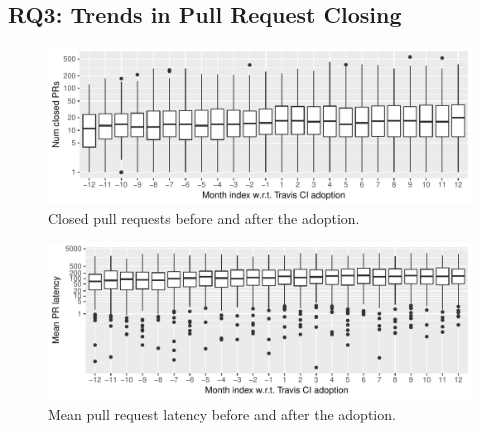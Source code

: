 


%
%




\subsection{RQ3: Trends in Pull Request Closing}

\begin{figure}[t]
\centering
\includegraphics[width=\columnwidth, clip=true, trim=0 0 0 0]{figures/pr-closed.pdf}
\caption{Closed pull requests before and after the \Tvis adoption.}\vspace{-0.4cm}
\label{fig:prs}
\end{figure}




\begin{figure}[t]
\centering
\includegraphics[width=\columnwidth, clip=true, trim=0 0 0 0]{figures/pr-latency.pdf}
\caption{Mean pull request latency before and after the \Tvis adoption.}\vspace{-0.4cm}
\label{fig:pr-latency}
\end{figure}

